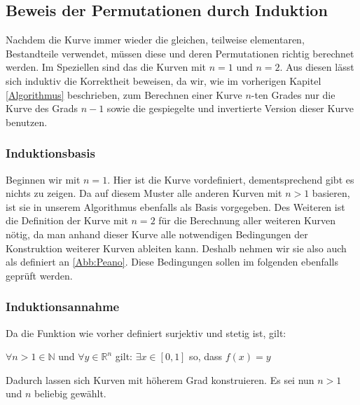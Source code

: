\documentclass[course=asp]{aspdoc}
\begin{document}
\subsection{Beweis der Permutationen durch Induktion} \label{Beweis der Permutationen durch Induktion}
Nachdem die Kurve immer wieder die gleichen, teilweise elementaren, Bestandteile verwendet, m\"ussen diese und deren Permutationen richtig berechnet werden. Im Speziellen sind das die Kurven mit $n = 1$ und $n = 2$. Aus diesen l\"asst sich induktiv die Korrektheit beweisen, da wir, wie im vorherigen Kapitel \ref{Algorithmus} beschrieben, zum Berechnen einer Kurve $n$-ten Grades nur die Kurve des Grads $n - 1$ sowie die gespiegelte und invertierte Version dieser Kurve benutzen.

\subsubsection{Induktionsbasis} \label{Induktionsbasis}
Beginnen wir mit $n = 1$. Hier ist die Kurve vordefiniert, dementsprechend gibt es nichts zu zeigen. Da auf diesem Muster alle anderen Kurven mit $n > 1$ basieren, ist sie in unserem Algorithmus ebenfalls als Basis vorgegeben.
Des Weiteren ist die Definition der Kurve mit $n = 2$ f\"ur die Berechnung aller weiteren Kurven n\"otig, da man anhand dieser Kurve alle notwendigen Bedingungen der Konstruktion weiterer Kurven ableiten kann. Deshalb nehmen wir sie also auch als definiert an \ref{Abb:Peano}. Diese Bedingungen sollen im folgenden ebenfalls gepr\"uft werden.

\subsubsection{Induktionsannahme} \label{Induktionsannahme}
Da die Funktion wie vorher definiert surjektiv und stetig ist, gilt:

\begin{center}
$\forall n > 1 \in \mathbb{N}$ und $\forall y \in \mathbb{R}^n$ gilt: $\exists x \in [0,1]$ so, dass $f(x)= y$
\end{center}

Dadurch lassen sich Kurven mit h\"oherem Grad konstruieren. Es sei nun $n > 1$ und $n$ beliebig gew\"ahlt.
\end{document}
